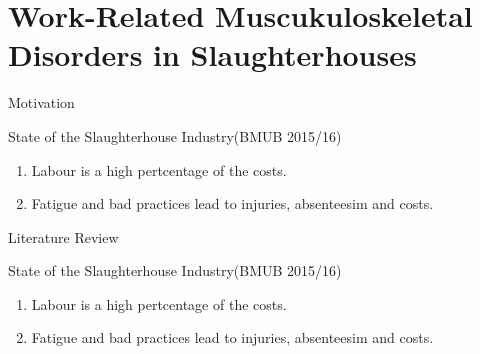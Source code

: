 
\section{Work-Related Muscukuloskeletal Disorders in Slaughterhouses}
\frame{\sectionpage}

\begin{frame}{Motivation}
    \begin{alertblock}{State of the Slaughterhouse Industry\hfill (BMUB 2015/16)}
    \begin{enumerate}%
    \item Labour is a high pertcentage of the costs.
    \item Fatigue and bad practices lead to injuries, absenteesim and costs.
    \end{enumerate}
    \end{alertblock}
\end{frame}




\begin{frame}{Literature Review}
    \begin{alertblock}{State of the Slaughterhouse Industry\hfill (BMUB 2015/16)}
    \begin{enumerate}%
    \item Labour is a high pertcentage of the costs.
    \item Fatigue and bad practices lead to injuries, absenteesim and costs.
    \end{enumerate}
    \end{alertblock}
\end{frame}

